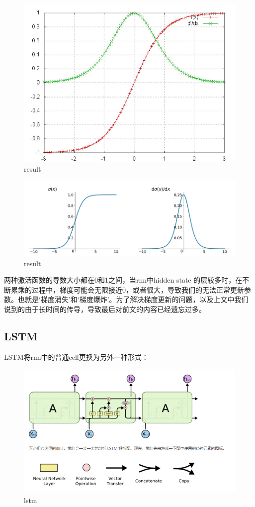 \documentclass{article}
\begin{document}
\begin{figure}
  \centering
  \includegraphics[width=.8\textwidth]{tanh.png} %
  \caption{result}
  \label{fig:fig1}
\end{figure}
\begin{figure}
  \centering
  \includegraphics[width=.8\textwidth]{sigmoid.png} %
  \caption{result}
  \label{fig:fig1}
\end{figure}

两种激活函数的导数大小都在0和1之间，当rnn中hidden state 的层较多时，在不断累乘的过程中，梯度可能会无限接近0，或者很大，导致我们的无法正常更新参数。也就是‘梯度消失’和‘梯度爆炸’。为了解决梯度更新的问题，以及上文中我们说到的由于长时间的传导，导致最后对前文的内容已经遗忘过多。


\subsection{LSTM}

LSTM将rnn中的普通cell更换为另外一种形式：

\begin{figure}
  \centering
  \includegraphics[width=.8\textwidth]{lstm.png} %
  \caption{lstm}
  \label{fig:fig1}
\end{figure}
\end{document}
